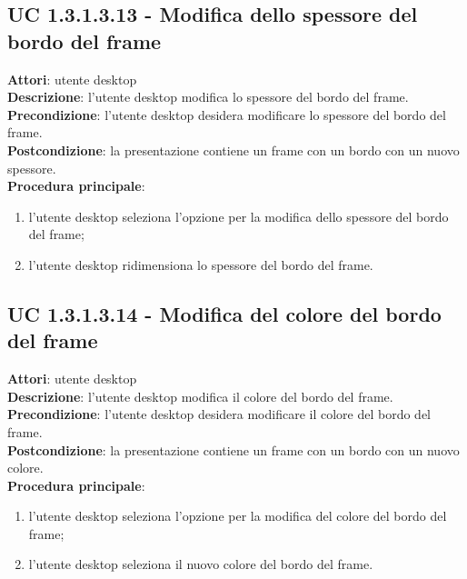 \subsection{UC 1.3.1.3.13 - Modifica dello spessore del bordo del frame}{
	\label{uc1.3.1.3.13}
	\textbf{Attori}: utente desktop \\
	\textbf{Descrizione}: l'utente desktop modifica lo spessore del bordo del frame. \\
	\textbf{Precondizione}: l'utente desktop desidera modificare lo spessore del bordo del frame.	\\
	\textbf{Postcondizione}: la presentazione contiene un frame con un bordo con un nuovo spessore.	\\
	\textbf{Procedura principale}:
	\begin{enumerate}
		\item l'utente desktop seleziona l'opzione per la modifica dello spessore del bordo del frame;
		\item l'utente desktop ridimensiona lo spessore del bordo del frame.
	\end{enumerate}
	}
\subsection{UC 1.3.1.3.14 - Modifica del colore del bordo del frame}{
	\label{uc1.3.1.3.14}
	\textbf{Attori}: utente desktop \\
	\textbf{Descrizione}: l'utente desktop modifica il colore del bordo del frame. \\
	\textbf{Precondizione}: l'utente desktop desidera modificare il colore del bordo del frame.	\\
	\textbf{Postcondizione}: la presentazione contiene un frame con un bordo con un nuovo colore.	\\
	\textbf{Procedura principale}:
	\begin{enumerate}
		\item l'utente desktop seleziona l'opzione per la modifica del colore del bordo del frame;
		\item l'utente desktop seleziona il nuovo colore del bordo del frame.
	\end{enumerate}
	}
